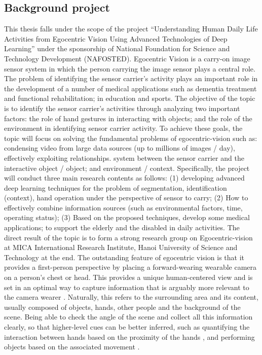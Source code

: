 \subsection{Background project}
This thesis falls under the scope of the project “Understanding Human Daily Life Activities from Egocentric Vision Using Advanced Technologies of Deep Learning” under the sponsorship of National Foundation for Science and Technology Development (NAFOSTED). Egocentric Vision is a carry-on image sensor system in which the person carrying the image sensor plays a central role. The problem of identifying the sensor carrier's activity plays an important role in the development of a number of medical applications such as dementia treatment and functional rehabilitation; in education and sports. The objective of the topic is to identify the sensor carrier's activities through analyzing two important factors: the role of hand gestures in interacting with objects; and the role of the environment in identifying sensor carrier activity. To achieve these goals, the topic will focus on solving the fundamental problems of egocentric-vision such as: condensing video from large data sources (up to millions of images / day), effectively exploiting relationships. system between the sensor carrier and the interactive object / object; and environment / context. Specifically, the project will conduct three main research contents as follows: (1) developing advanced deep learning techniques for the problem of segmentation, identification (context), hand operation under the perspective of sensor to carry; (2) How to effectively combine information sources (such as environmental factors, time, operating status); (3) Based on the proposed techniques, develop some medical applications; to support the elderly and the disabled in daily activities. The direct result of the topic is to form a strong research group on Egocentric-vision at MICA International Research Institute, Hanoi University of Science and Technology at the end. The outstanding feature of egocentric vision is that it provides a first-person perspective by placing a forward-wearing wearable camera on a person’s chest or head. This provides a unique human-centered view and is set in an optimal way to capture information that is arguably more relevant to the camera wearer \cite{6232429}. Naturally, this refers to the surrounding area and its content, usually composed of objects, hands, other people and the background of the scene. Being able to check the angle of the scene and collect all this information clearly, so that higher-level cues can be better inferred, such as quantifying the interaction between hands based on the proximity of the hands \cite{Recognition}, and performing objects based on the associated movement \cite{Bertasius}.

